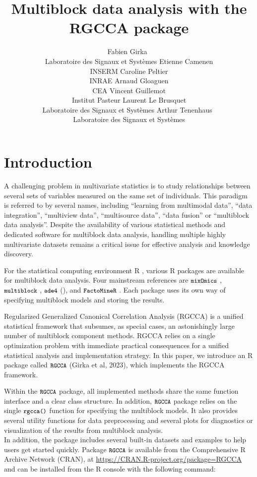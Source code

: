 \documentclass[
]{jss}
\author{
Fabien Girka~\orcidlink{0000-0003-2843-1104}\\Laboratoire des Signaux et
Systèmes \And Etienne Camenen\\INSERM \And Caroline Peltier\\INRAE
\AND Arnaud Gloaguen\\CEA \And Vincent Guillemot\\Institut Pasteur
\AND Laurent Le Brusquet\\Laboratoire des Signaux et
Systèmes \And Arthur
Tenenhaus~\orcidlink{0000-0003-3459-1518}\\Laboratoire des Signaux et
Systèmes
}
\title{Multiblock data analysis with the RGCCA package}
\begin{document}
\newtheorem{theorem}{theorem}[section]%
\newtheorem{lemma}[theorem]{Lemma}
\newtheorem{proposition}[theorem]{Proposition}
\newtheorem{corollary}[theorem]{Corollary}
\newtheorem{remark}[theorem]{Remark}

\hypertarget{introduction}{%
\section{Introduction}\label{introduction}}

A challenging problem in multivariate statistics is to study
relationships between several sets of variables measured on the same set
of individuals. This paradigm is referred to by several names, including
``learning from multimodal data'', ``data integration'', ``multiview
data'', ``multisource data'', ``data fusion'' or ``multiblock data
analysis''. Despite the availability of various statistical methods and
dedicated software for multiblock data analysis, handling multiple
highly multivariate datasets remains a critical issue for effective
analysis and knowledge discovery.

For the statistical computing environment R \cite{R2022}, various R
packages are available for multiblock data analysis. Four mainstream
references are \(\small{\texttt{mixOmics}}\) \cite{Rohart2017},
\(\small{\texttt{multiblock}}\) \cite{Liland2022},
\(\small{\texttt{ade4}}\) (\cite{Dray2007}), and
\(\small{\texttt{FactoMineR}}\) \cite{Le2008}. Each package uses its own
way of specifying multiblock models and storing the results.

Regularized Generalized Canonical Correlation Analysis (RGCCA) is a
unified statistical framework that subsumes, as special cases, an
astonishingly large number of multiblock component methods. RGCCA relies
on a single optimization problem with immediate practical consequences
for a unified statistical analysis and implementation strategy. In this
paper, we introduce an R package called \(\small{\texttt{RGCCA}}\)
(Girka et al, 2023), which implements the RGCCA framework.

Within the \(\small{\texttt{RGCCA}}\) package, all implemented methods
share the same function interface and a clear class structure. In
addition, \(\small{\texttt{RGCCA}}\) package relies on the single
\(\small{\texttt{rgcca()}}\) function for specifying the multiblock
models. It also provides several utility functions for data
preprocessing and several plots for diagnostics or visualization of the
results from multiblock analysis.\\
In addition, the package includes several built-in datasets and examples
to help users get started quickly. Package \(\small{\texttt{RGCCA}}\) is
available from the Comprehensive R Archive Network (CRAN), at
\url{https://CRAN.R-project.org/package=RGCCA} and can be installed from
the R console with the following command:
\end{document}
